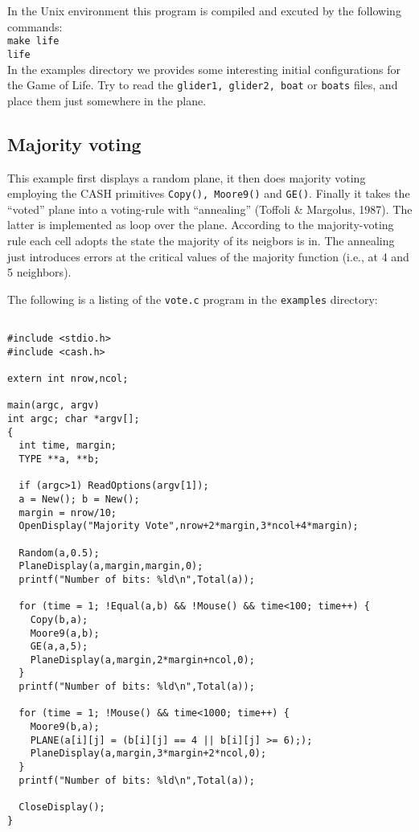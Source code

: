 \documentclass[12pt]{article}
\newcommand{\mtt}[1]{\texttt{\\#1\\}}
\begin{document}
In the Unix environment this program is compiled and
excuted by the following commands:
\mtt{ make life\\life}
In the examples directory we provides some interesting
initial configurations for the Game of Life. Try to read
the {\tt  glider1, glider2, boat} or {\tt boats} files,
and place them just somewhere in the plane.

\subsection{Majority voting}
This example first displays a random plane, it then does
majority voting employing the CASH primitives {\tt Copy(), Moore9()}
and {\tt GE()}. Finally it takes the ``voted'' plane into
a voting-rule with ``annealing'' (Toffoli \& Margolus, 1987). 
The latter is implemented as loop over the plane.
According to the majority-voting rule each cell adopts
the state the majority of its neigbors is in.
The annealing just introduces errors at the critical
values of the majority function (i.e., at 4 and 5 neighbors).

The following is a listing of the {\tt vote.c} program
in the {\tt examples} directory:
\begin{verbatim}

#include <stdio.h>
#include <cash.h>

extern int nrow,ncol;

main(argc, argv)
int argc; char *argv[];
{
  int time, margin;
  TYPE **a, **b;

  if (argc>1) ReadOptions(argv[1]);
  a = New(); b = New();
  margin = nrow/10;
  OpenDisplay("Majority Vote",nrow+2*margin,3*ncol+4*margin);

  Random(a,0.5);
  PlaneDisplay(a,margin,margin,0);
  printf("Number of bits: %ld\n",Total(a));

  for (time = 1; !Equal(a,b) && !Mouse() && time<100; time++) {
    Copy(b,a);
    Moore9(a,b);
    GE(a,a,5);
    PlaneDisplay(a,margin,2*margin+ncol,0);
  }
  printf("Number of bits: %ld\n",Total(a));

  for (time = 1; !Mouse() && time<1000; time++) {
    Moore9(b,a);
    PLANE(a[i][j] = (b[i][j] == 4 || b[i][j] >= 6););
    PlaneDisplay(a,margin,3*margin+2*ncol,0);
  }
  printf("Number of bits: %ld\n",Total(a));

  CloseDisplay();
}
\end{verbatim}
\end{document}
